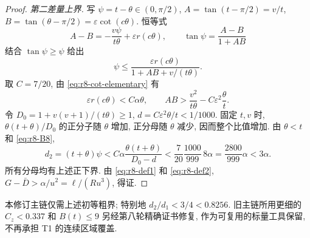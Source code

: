 \documentclass[UTF8]{ctexart}
\begin{document}
\begin{proof}
\emph{第二差量上界.} 写 $\psi=t-\theta\in(0,\pi/2)$,
$A=\tan(t-\pi/2)=v/t$, $B=\tan(\theta-\pi/2)=\varepsilon\cot(c\theta)$.
恒等式
\[
 A-B=-\frac{v\psi}{t\theta}+\varepsilon r(c\theta),\qquad
 \tan\psi=\frac{A-B}{1+AB}
\]
结合 $\tan\psi\ge\psi$ 给出
\[
 \psi\le\frac{\varepsilon r(c\theta)}{1+AB+v/(t\theta)}.
\]
取 $C=7/20$, 由 \eqref{eq:r8-cot-elementary} 有
\[
 \varepsilon r(c\theta)<C\alpha\theta,\qquad
 AB>\frac{v^2}{t\theta}-C\varepsilon^2\frac\theta t.
\]
令 $D_0=1+v(v+1)/(t\theta)\ge1$, $d=C\varepsilon^2\theta/t<1/1000$.
固定 $t,v$ 时, $\theta(t+\theta)/D_0$ 的正分子随 $\theta$ 增加,
正分母随 $\theta$ 减少, 因而整个比值增加. 由 $\theta<t$ 和 \eqref{eq:r8-B8},
\begin{equation}
 d_2=(t+\theta)\psi
 < C\alpha\frac{\theta(t+\theta)}{D_0-d}
 <\frac7{20}\frac{1000}{999}\,8\alpha
 =\frac{2800}{999}\alpha<3\alpha.\label{eq:r8-def2}
\end{equation}
所有分母均有上述正下界. 由 \eqref{eq:r8-def1} 和 \eqref{eq:r8-def2},
$G-\bar D>\alpha/u^2=\ell/(Ru^3)$, 得证.
\end{proof}

本修订主链仅需上述初等粗界; 特别地 $d_2/d_1<3/4<0.8256$.
旧主链所用更细的 $C_z<0.337$ 和 $B(t)\le9$ 另经第八轮精确证书修复,
作为可复用的标量工具保留, 不再承担 T1 的连续区域覆盖.
\end{document}
